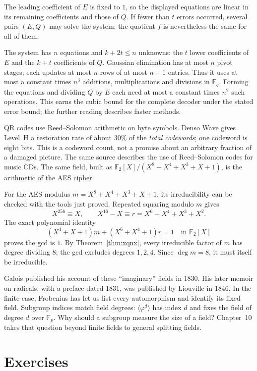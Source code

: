 The leading coefficient of $E$ is fixed to $1$, so the displayed equations
are linear in its remaining coefficients and those of $Q$. If fewer than
$t$ errors occurred, several pairs $(E,Q)$ may solve the system; the quotient
$f$ is nevertheless the same for all of them.

The system has $n$ equations and $k+2t\le n$ unknowns: the $t$ lower
coefficients of $E$ and the $k+t$ coefficients of $Q$. Gaussian
elimination has at most $n$ pivot stages; each updates at most $n$
rows of at most $n+1$ entries. Thus it uses at most a constant times
$n^3$ additions, multiplications and divisions in $\mathbb F_q$.
Forming the equations and dividing $Q$ by $E$ each need at most a
constant times $n^2$ such operations. This earns the cubic bound for
the complete decoder under the stated error bound; the further reading
describes faster methods.

QR codes use Reed--Solomon arithmetic on byte symbols. Denso Wave gives
Level~H a restoration rate of about $30\%$ of the \emph{total codewords};
one codeword is eight bits. This is a codeword count, not a promise about
an arbitrary fraction of a damaged picture. The same source describes the
use of Reed--Solomon codes for music CDs. The same field, built as $\mathbb F_2[X]/(X^8+X^4+X^3+X+1)$, is the arithmetic of the AES cipher.

For the AES modulus $m=X^8+X^4+X^3+X+1$, its irreducibility can be
checked with the tools just proved. Repeated squaring modulo $m$ gives
\[
X^{256}\equiv X,\qquad X^{16}-X\equiv r=X^6+X^4+X^3+X^2.
\]
The exact polynomial identity
\[
(X^4+X+1)m+(X^6+X^4+1)r=1
\quad\text{in }\mathbb F_2[X]
\]
proves the gcd is $1$. By Theorem~\ref{thm:xqnx}, every irreducible factor
of $m$ has degree dividing $8$; the gcd excludes degrees $1,2,4$.
Since $\deg m=8$, it must itself be irreducible.

\begin{beauty}
Galois published his account of these ``imaginary'' fields in 1830.
His later memoir on radicals, with a preface dated 1831, was published
by Liouville in 1846. In the finite case, Frobenius has let us list
every automorphism and identify its fixed field. Subgroup indices
match field degrees: $\langle\varphi^d\rangle$ has index $d$ and
fixes the field of degree $d$ over $\mathbb F_p$.
Why should a subgroup measure the size of a field? Chapter~10 takes
that question beyond finite fields to general splitting fields.
\end{beauty}

\section{Exercises}

